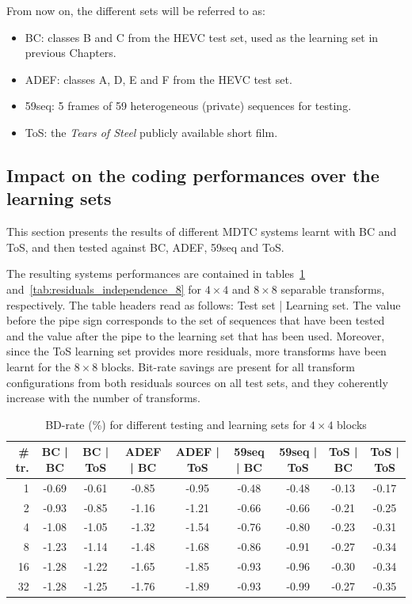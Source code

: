 \documentclass[11pt,a4paper,openright,twoside]{book}
\numberwithin{equation}{section} %
\numberwithin{figure}{section} %
\numberwithin{table}{section} %
\begin{document}
From now on, the different sets will be referred to as:
\begin{itemize}
	\item BC: classes B and C from the \ac{HEVC} test set, used as the
		learning set in previous Chapters.
	\item ADEF: classes A, D, E and F from the \ac{HEVC} test set.
	\item 59seq: 5 frames of 59 heterogeneous (private) sequences for testing.
	\item ToS: the \emph{Tears of Steel} publicly available short film.
\end{itemize}

\subsection{Impact on the coding performances over the learning sets}
\label{sub:rw_performances_new_data_set}

This section presents the results of different \ac{MDTC} systems learnt with
BC and ToS, and then tested against BC, ADEF, 59seq and ToS.

The resulting systems performances are contained in
tables~\ref{tab:residuals_independence_4}
and~\ref{tab:residuals_independence_8} for $4\times4$ and $8\times8$ separable
transforms, respectively.
The table headers read as follows: Test set | Learning set.
The value before the pipe sign corresponds to the set of sequences that have
been tested and the value after the pipe to the learning set that has been
used.
Moreover, since the ToS learning set provides more residuals, more transforms
have been learnt for the $8\times8$ blocks.
Bit-rate savings are present for all transform configurations from both
residuals sources on all test sets, and they coherently increase with the
number of transforms.

\begin{table}[tb]
	\centering
	\small
	\begin{tabularx}{\linewidth}{r|cc|cc|cc|cc}
		\# tr. & BC | BC & BC | ToS & ADEF | BC & ADEF | ToS & 59seq | BC &
		59seq | ToS & ToS | BC & ToS | ToS \\
		\hline\hline
		1  & -0.69 & -0.61 & -0.85 & -0.95 & -0.48 & -0.48 & -0.13 & -0.17 \\
		2  & -0.93 & -0.85 & -1.16 & -1.21 & -0.66 & -0.66 & -0.21 & -0.25 \\
		4  & -1.08 & -1.05 & -1.32 & -1.54 & -0.76 & -0.80 & -0.23 & -0.31 \\
		8  & -1.23 & -1.14 & -1.48 & -1.68 & -0.86 & -0.91 & -0.27 & -0.34 \\
		16 & -1.28 & -1.22 & -1.65 & -1.85 & -0.93 & -0.96 & -0.30 & -0.34 \\
		32 & -1.28 & -1.25 & -1.76 & -1.89 & -0.93 & -0.99 & -0.27 & -0.35 \\
	\end{tabularx}
	\caption{\acs{BD}-rate (\%) for different testing and learning sets for
	$4\times4$ blocks}
	\label{tab:residuals_independence_4}
\end{table}
\end{document}
